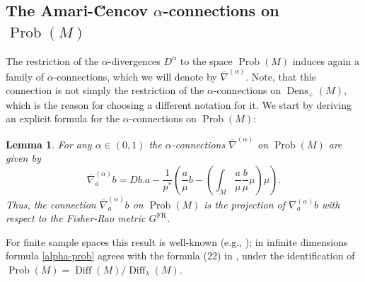 \documentclass[11pt]{amsart}
\newtheorem{lemma}[theorem]{Lemma}
\theoremstyle{definition}
\newcommand{\dx}{\lambda}
\newcommand{\Prob}{\operatorname{Prob}(M)}
\newcommand{\Dens}{\operatorname{Dens}_+(M)}
\newcommand{\Diff}{\operatorname{Diff}(M)}
\newcommand{\SDiff}{\operatorname{Diff}_{\dx}(M)}
\newcommand{\GFR}{G^{\mathrm{FR}}}
\newcommand{\nablabar}{\overline{\nabla}}
\begin{document}
\subsection{The Amari-\u{C}encov $\alpha$-connections on $\Prob$}
The restriction of the $\alpha$-divergences $D^{\alpha}$ to the space $\Prob$ induces again a family of $\alpha$-connections, which we will denote by  $\nablabar^{(\alpha)}$. Note, that this connection is not simply the restriction of the $\alpha$-connections on $\Dens$, which is the reason for choosing a different notation for it.
We start by deriving an explicit formula for the $\alpha$-connections on $\Prob$: 
\begin{lemma}
 For any $\alpha\in (0,1)$ the $\alpha$-connections $\nablabar^{(\alpha)}$ on $\Prob$ are given by
    \begin{equation}\label{alpha-prob}
    \nablabar^{(\alpha)}_a b = Db.a - \frac{1}{p^*} \left(\frac{a}{\mu}b -\left(\int_M \frac{a}{\mu}\frac{b}{\mu} \mu\right)\mu\right).
    \end{equation}
Thus, the connection  $\nablabar^{(\alpha)}_a b$ on $\Prob$ is the projection of $\nabla^{(\alpha)}_a b$ with respect to the Fisher-Rao metric $\GFR$.    
\end{lemma}

For finite sample spaces this result is well-known (e.g., \cite[Section~2.5.2]{ay2017information});
in infinite dimensions formula \eqref{alpha-prob} agrees with the formula (22) in \cite{lenells2014amari}, under the identification of $\Prob = \Diff/\SDiff$.
\end{document}
